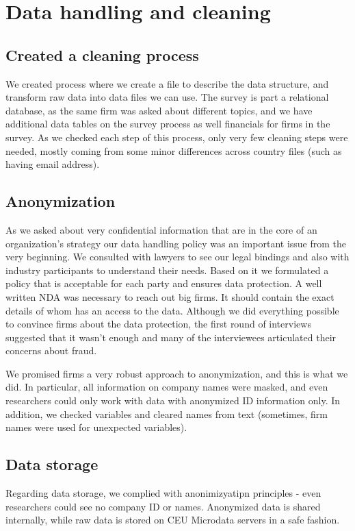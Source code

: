 \documentclass[final, dvipsnames, authoryear,12pt]{elsarticle}
\begin{document}
\section{Data handling and cleaning}

\subsection{Created a cleaning process}

We created process where we create a file to describe the data structure, and transform raw data into data files we can use. The survey is part a relational database, as the same firm was asked about different topics, and we have additional data tables on the survey process as well financials for firms in the survey. As we checked each step of this process, only very few cleaning steps were needed, mostly coming from some minor differences across country files (such as having email address). 

\subsection{Anonymization} 
As we asked about very confidential information that are in the core of an organization’s strategy our data handling policy was an important issue from the very beginning. We consulted with lawyers to see our legal bindings and also with industry participants to understand their needs. Based on it we formulated a policy that is acceptable for each party and ensures data protection. A well written NDA was necessary to reach out big firms. It should contain the exact details of whom has an access to the data. Although we did everything possible to convince firms about the data protection, the first round of interviews suggested that it wasn’t enough and many of the interviewees articulated their concerns about fraud.

We promised firms a very robust approach to anonymization, and this is what we did. In particular, all information on company names were masked, and even researchers could only work with data with anonymized ID information only. In addition, we checked variables and cleared names from text (sometimes, firm names were used for unexpected variables).

\subsection{Data storage}
Regarding data storage, we complied with anonimizyatipn principles - even researchers could see no company ID or names. Anonymized data is shared internally, while raw data is stored on CEU Microdata servers in a safe fashion. 
\end{document}
